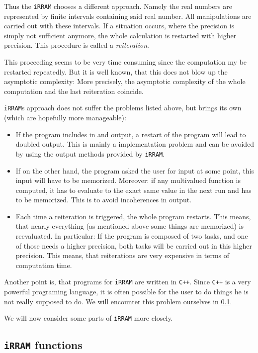 \documentclass{article}
\newcommand{\irram}{\texttt{iRRAM}\xspace}
\newcommand{\irrams}{\texttt{iRRAM}s\xspace}
\newcommand{\cc}{\texttt{C++}\xspace}
\begin{document}
Thus the \irram chooses a different approach. Namely the real numbers are represented by finite intervals containing said real number. All manipulations are carried out with these intervals. If a situation occurs, where the precision is simply not sufficient anymore, the whole calculation is restarted with higher precision. This procedure is called a \emph{reiteration}.

This proceeding seems to be very time consuming since the computation my be restarted repeatedly. But it is well known, that this does not blow up the asymptotic complexity: More precisely, the asymptotic complexity of the whole computation and the last reiteration coincide.

\irrams approach does not suffer the problems listed above, but brings its own (which are hopefully more manageable):
\begin{itemize}
\item If the program includes in and output, a restart of the program will lead to doubled output. This is mainly a implementation problem and can be avoided by using the output methods provided by \irram.
\item If on the other hand, the program asked the user for input at some point, this input will have to be memorized. Moreover: if any multivalued function is computed, it has to evaluate to the exact same value in the next run and has to be memorized. This is to avoid incoherences in output.
\item Each time a reiteration is triggered, the whole program restarts. This means, that nearly everything (as mentioned above some things are memorized) is reevaluated. In particular: If the program is composed of two tasks, and one of those needs a higher precision, both tasks will be carried out in this higher precision. This means, that reiterations are very expensive in terms of computation time.
\end{itemize}

Another point is, that programs for \irram are written in \cc. Since \cc is a very powerful programing language, it is often possible for the user to do things he is not really supposed to do. We will encounter this problem ourselves in \ref{}.

We will now consider some parts of \irram more closely.

\subsection{\irram functions}
\end{document}
